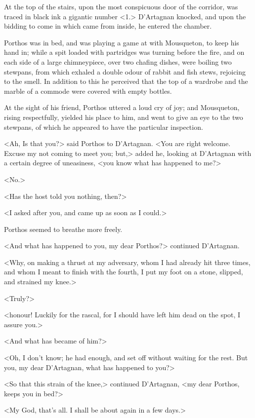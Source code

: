 At the top of the stairs, upon the most conspicuous door of the corridor, was traced in black ink a gigantic number <1.> D'Artagnan knocked, and upon the bidding to come in which came from inside, he entered the chamber. 

Porthos was in bed, and was playing a game at  with Mousqueton, to keep his hand in; while a spit loaded with partridges was turning before the fire, and on each side of a large chimneypiece, over two chafing dishes, were boiling two stewpans, from which exhaled a double odour of rabbit and fish stews, rejoicing to the smell. In addition to this he perceived that the top of a wardrobe and the marble of a commode were covered with empty bottles. 

At the sight of his friend, Porthos uttered a loud cry of joy; and Mousqueton, rising respectfully, yielded his place to him, and went to give an eye to the two stewpans, of which he appeared to have the particular inspection. 

<Ah,  Is that you?> said Porthos to D'Artagnan. <You are right welcome. Excuse my not coming to meet you; but,> added he, looking at D'Artagnan with a certain degree of uneasiness, <you know what has happened to me?> 

<No.> 

<Has the host told you nothing, then?> 

<I asked after you, and came up as soon as I could.> 

Porthos seemed to breathe more freely. 

<And what has happened to you, my dear Porthos?> continued D'Artagnan. 

<Why, on making a thrust at my adversary, whom I had already hit three times, and whom I meant to finish with the fourth, I put my foot on a stone, slipped, and strained my knee.> 

<Truly?> 

<honour! Luckily for the rascal, for I should have left him dead on the spot, I assure you.> 

<And what has became of him?> 

<Oh, I don't know; he had enough, and set off without waiting for the rest. But you, my dear D'Artagnan, what has happened to you?> 

<So that this strain of the knee,> continued D'Artagnan, <my dear Porthos, keeps you in bed?> 

<My God, that's all. I shall be about again in a few days.> 

